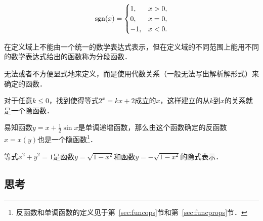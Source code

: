 \begin{definition*}[符号函数]
  \[
    \operatorname{sgn}(x) =
    \begin{cases}
      1, & x > 0, \\
      0, & x = 0, \\
      -1, & x < 0.
    \end{cases}
  \]
\end{definition*}

\begin{definition*}[分段函数]
  在定义域上不能由一个统一的数学表达式表示，但在定义域的不同范围上能用不同的数学表达式给出的函数称为分段函数．
\end{definition*}

\begin{definition*}[隐函数]
  无法或者不方便显式地来定义，而是使用代数关系（一般无法写出解析解形式）来确定的函数．
\end{definition*}

\begin{example*}
  对于任意\(k \le 0\)，找到使得等式\(2^x = kx + 2\)成立的\(x\)，这样建立的从\(k\)到\(x\)的关系就是一个隐函数．
\end{example*}

\begin{example*}
  易知函数\(y = x + \frac12 \sin x\)是单调递增函数，那么由这个函数确定的反函数\(x = x(y)\)也是一个隐函数\footnote{反函数和单调函数的定义见于第~\ref{sec:funcops}节和第~\ref{sec:funcprops}节．}．
\end{example*}

\begin{example*}
  等式\(x^2 + y^2 = 1\)是函数\(y = \sqrt{1 - x^2}\)和函数\(y = -\sqrt{1 - x^2}\)的隐式表示．
\end{example*}

\subsection*{思考}

